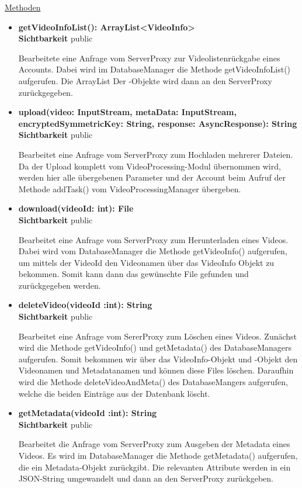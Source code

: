\underline{Methoden}
\begin{itemize}
\itemsep0pt
\item \textbf{getVideoInfoList(): ArrayList<VideoInfo>}\hfill\\
\textbf{Sichtbarkeit} public

Bearbeitete eine Anfrage vom ServerProxy zur Videolistenrückgabe eines Accounts. Dabei wird im DatabaseManager die Methode getVideoInfoList() aufgerufen. Die ArrayList Der -Objekte wird dann an den ServerProxy zurückgegeben.    

\item \textbf{upload(video: InputStream, metaData: InputStream,
encryptedSymmetricKey: String, response: AsyncResponse): String}\hfill\\
\textbf{Sichtbarkeit} public

Bearbeitet eine Anfrage vom ServerProxy zum Hochladen mehrerer Dateien. Da der Upload komplett vom VideoProcessing-Modul übernommen wird, werden hier alle übergebenen Parameter und der Account beim Aufruf der Methode addTask() vom VideoProcessingManager übergeben.

\item \textbf{download(videoId: int): File}\hfill\\
\textbf{Sichtbarkeit} public

Bearbeitet eine Anfrage vom ServerProxy zum Herunterladen eines Videos. Dabei wird vom DatabaseManager die Methode getVideoInfo() aufgerufen, um mittels der VideoId den Videonamen über das VideoInfo Objekt zu bekommen. Somit kann dann das gewünschte File gefunden und zurückgegeben werden.

\item \textbf{deleteVideo(videoId :int): String}\hfill\\
\textbf{Sichtbarkeit} public

Bearbeitet eine Anfrage vom SererProxy zum Löschen eines Videos. Zunächst wird die Methode getVideoInfo() und getMetadata() des DatabaseManagers aufgerufen. Somit bekommen wir über das VideoInfo-Objekt und -Objekt den Videonamen und Metadatanamen und können diese Files löschen. Daraufhin wird die Methode deleteVideoAndMeta() des DatabaseMangers aufgerufen, welche die beiden Einträge aus der Datenbank löscht.

\item \textbf{getMetadata(videoId :int): String}\hfill\\
\textbf{Sichtbarkeit} public

Bearbeitet die Anfrage vom ServerProxy zum Ausgeben der Metadata eines Videos. Es wird im DatabaseManager die Methode getMetadata() aufgerufen, die ein Metadata-Objekt zurückgibt. Die relevanten Attribute werden in ein JSON-String umgewandelt und dann an den ServerProxy zurückgeben.
\end{itemize}